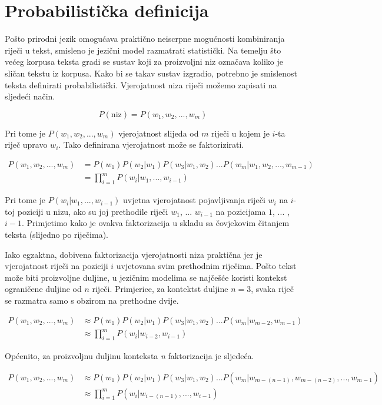 \documentclass[times, utf8, diplomski, numeric]{fer}
\begin{document}
\section{Probabilistička definicija}

Pošto prirodni jezik omogućava praktično neiscrpne mogućnosti kombiniranja riječi u tekst, smisleno je jezični model razmatrati statistički. Na temelju što većeg korpusa teksta gradi se sustav koji za proizvoljni niz označava koliko je sličan tekstu iz korpusa. Kako bi se takav sustav izgradio, potrebno je smislenost teksta definirati probabilistički. Vjerojatnost niza riječi možemo zapisati na sljedeći način.

\[
P(\text{niz}) = P(w_1, w_2, ... , w_m)
\]

Pri tome je $P(w_1, w_2, ... , w_m)$ vjerojatnost slijeda od $m$ riječi u kojem je $i$-ta riječ upravo $w_i$. Tako definirana vjerojatnost može se faktorizirati.

\begin{align*}
P(w_1, w_2, ... , w_m)
  &= P(w_1) P(w_2 | w_1) P(w_3 | w_1, w_2) ... P(w_m | w_1, w_2, ... , w_{m - 1 }) \\
  &= \prod_{i = 1}^m{P(w_i|w_1, ... , w_{i - 1})}
\end{align*}

Pri tome je $P(w_i | w_1, ... , w_{i - 1})$ uvjetna vjerojatnost pojavljivanja riječi $w_i$ na $i$-toj poziciji u nizu, ako su joj prethodile riječi $w_1$, ... $w_{i - 1}$ na pozicijama $1$, ... , $i - 1$. Primjetimo kako je ovakva faktorizacija u skladu sa čovjekovim čitanjem teksta (slijedno po riječima).

Iako egzaktna, dobivena faktorizacija vjerojatnosti niza praktična jer je vjerojatnost riječi na poziciji $i$ uvjetovana svim prethodnim riječima. Pošto tekst može biti proizvoljne duljine, u jezičnim modelima se najčešće koristi kontekst ograničene duljine od $n$ riječi. Primjerice, za kontektst duljine $n = 3$, svaka riječ se razmatra samo s obzirom na prethodne dvije.

\begin{align*}
P(w_1, w_2, ... , w_m)
  &\approx P(w_1) P(w_2 | w_1) P(w_3 | w_1, w_2)  ... P(w_m | w_{m - 2}, w_{m - 1}) \\
  &\approx \prod_{i = 1}^m{P(w_i | w_{i - 2}, w_{i - 1})}
\end{align*}

Općenito, za proizvoljnu duljinu konteksta \textit{n} faktorizacija je sljedeća.

\begin{align*}
P(w_1, w_2, ... , w_m)
  &\approx P(w_1) P(w_2 | w_1) P(w_3 | w_1, w_2)  ... P(w_m | w_{m - (n - 1)}, w_{m - (n - 2)}, ... , w_{m - 1}) \\
  &\approx \prod_{i = 1}^m{P(w_i | w_{i - (n - 1)}, ... , w_{i - 1})}
\end{align*}
\end{document}
